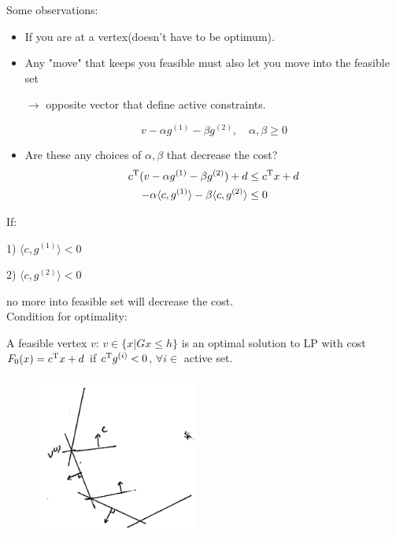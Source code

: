 \vspace{0.5cm}
Some observations:
\begin{itemize}
	\item If you are at a vertex(doesn't have to be optimum). 
	
	\item Any "move" that keeps you feasible must also let you move into the feasible set 
	
	$\rightarrow$ opposite vector that define active constraints.
	
	\begin{equation*}
		v - \alpha g^{(1)} - \beta g^{(2)}, \quad \alpha, \beta \geq 0
	\end{equation*}
	
	\item Are these any choices of $\alpha, \beta$ that decrease the cost?
	\begin{align*}
		c^{{\rm T}}(v - \alpha g^{(1)} - \beta g^{(2)}) + d &\leq c^{{\rm T}}x + d\\
		-\alpha \langle c, g^{(1)}\rangle  - \beta \langle c, g^{(2)}\rangle &\leq 0
	\end{align*}
\end{itemize}

If:

1) $\langle c, g^{(1)}\rangle < 0$

2) $\langle c, g^{(2)}\rangle < 0$

no more into feasible set will decrease the cost.\\ 

\vspace{0.5cm}
Condition for optimality:

A feasible vertex $v$: $v\in\{x|Gx \leq h \}$ is an optimal solution to LP with cost $F_0(x) = c^{{\rm T}}x + d$ if $c^{{\rm T}}g^{(i)} < 0$, $\forall i\in$ active set.\\

\begin{figure}
	\centering
	\includegraphics[width=2.1in,height=2.1in]{figures/ch07/figure1012_9.png}
\end{figure}


